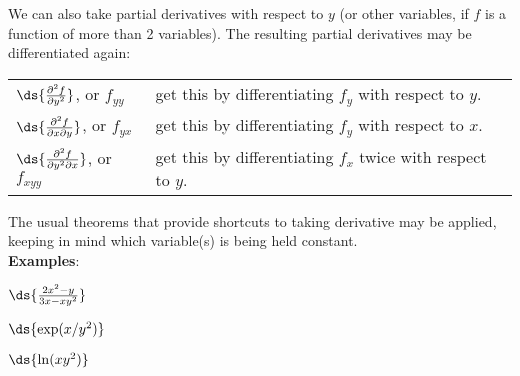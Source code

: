 \documentclass[12pt,fleqn]{article}
\def\egs#1{{\bf Examples}: #1}
\begin{document}
\np
\ni
We can also take partial derivatives with respect to $y$ (or other
variables, if $f$ is a function of more than 2 variables).  The resulting
partial derivatives may be differentiated again:
\bq
  \begin{tabular}{ll}
	$\ds{\frac{\partial^2 f}{\partial y^2}}$, \; or \; $f_{yy}$ &
	  get this by differentiating $f_y$ with respect to $y$. \\[16pt]
	$\ds{\frac{\partial^2 f}{\partial x \partial y}}$, \; or \; $f_{yx}$ &
	  get this by differentiating $f_y$ with respect to $x$. \\[16pt]
	$\ds{\frac{\partial^2 f}{\partial y^2 \partial x}}$, \; or \; $f_{xyy}$
	  \phantom{XX} & get this by differentiating $f_x$
	  twice with respect to $y$.
  \end{tabular}
\eq

\vspace{0.2in}
\ni
The usual theorems that provide shortcuts to taking derivative may
be applied, keeping in mind which variable(s) is being held constant.\\[8pt]
\egs{}
\bi
\item[] $\ds{ \frac{2x^2 - y}{3x - xy^2} }$\\[24pt]
\item[] $\ds{ \exp(x/y^2) }$\\[24pt]
\item[] $\ds{ \ln(xy^2) }$
\ei
\end{document}
